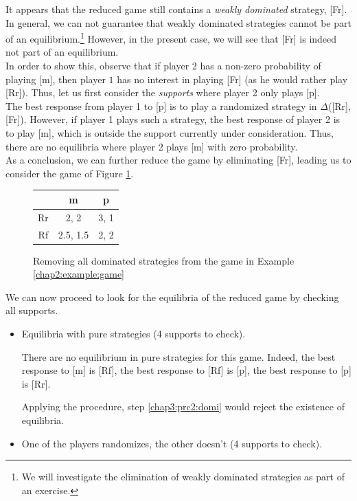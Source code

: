 \begin{example}
It appears that the reduced game still contains a \emph{weakly dominated} strategy, [Fr].
In general, we can not guarantee that weakly dominated strategies cannot be part of an equilibrium.\footnote{We will investigate the elimination of weakly dominated strategies as part of an exercise.}
However, in the present case, we will see that [Fr] is indeed not part of an equilibrium.\\
In order to show this, observe that if player 2 has a
 non-zero probability of playing [m],
  then player $1$ has no interest in playing [Fr] (as he would rather play [Rr]).
 Thus, let us first consider the \emph{supports} where player 2 only plays  [p].\\
 The best response from player 1 to [p] is to play a randomized strategy in $\Delta$([Rr], [Fr]).
 However, if player 1 plays such a strategy,   the best response of player 2 is to play [m],
  which is outside the support currently under consideration.
   Thus, there are no equilibria where player 2 plays [m] with zero probability.\\
   As a conclusion, we can further reduce the game by eliminating [Fr], leading us to consider the game of Figure \ref{chap3:tablefromchap2-reduced2}.



\begin{figure}[!ht]
\centering
\begin{tabular}{c|cc}
 & m & p \\
\hline
Rr & 2, 2 & 3, 1 \\
Rf & 2.5, 1.5 & 2, 2
\end{tabular}
\caption{Removing all dominated strategies from the game in Example \ref{chap2:example:game}}
\label{chap3:tablefromchap2-reduced2}
\end{figure}

We can now proceed to look for the equilibria of the reduced game by checking all supports.
\begin{itemize}
\item[\textbf{Case 1:}] Equilibria with pure strategies (4 supports to check).

There are no equilibrium in pure strategies for this game. Indeed, the best response to [m] is [Rf], the best response to [Rf] is [p], the best response to [p] is [Rr].

Applying the procedure, step \ref{chap3:prc2:domi} would reject the existence of equilibria.

\item[\textbf{Case 2:}] One of the players randomizes, the other doesn't (4 supports to check).


\end{itemize}
\end{example}
